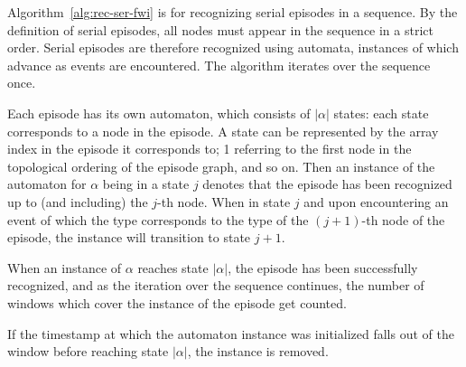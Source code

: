 Algorithm~\ref{alg:rec-ser-fwi} is for recognizing serial episodes in a sequence. By the definition of serial episodes, all nodes must appear in the sequence in a strict order. Serial episodes are therefore recognized using automata, instances of which advance as events are encountered. The algorithm iterates over the sequence once.

Each episode has its own automaton, which consists of $ | \alpha | $ states: each state corresponds to a node in the episode. A state can be represented by the array index in the episode it corresponds to; 1 referring to the first node in the topological ordering of the episode graph, and so on. Then an instance of the automaton for $ \alpha $ being in a state $ j $ denotes that the episode has been recognized up to (and including) the $ j $-th node. When in state $ j $ and upon encountering an event of which the type corresponds to the type of the $ (j + 1) $-th node of the episode, the instance will transition to state $ j + 1 $.

When an instance of $ \alpha $ reaches state $ | \alpha | $, the episode has been successfully recognized, and as the iteration over the sequence continues, the number of windows which cover the instance of the episode get counted.

If the timestamp at which the automaton instance was initialized falls out of the window before reaching state $ | \alpha | $, the instance is removed.

